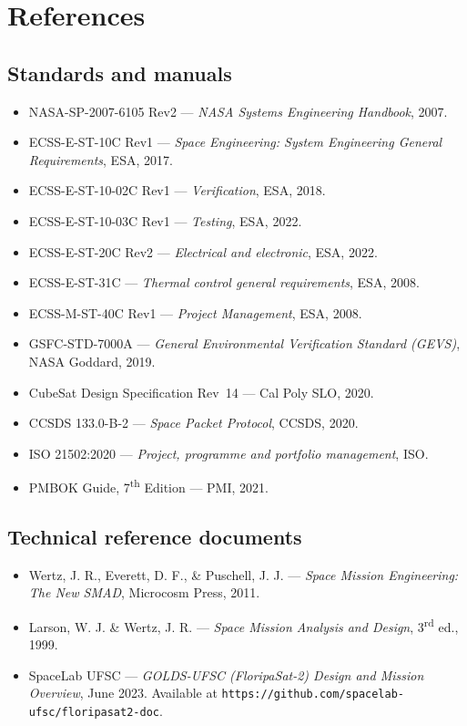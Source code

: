 \chapter{References}

\section*{Standards and manuals}
\begin{itemize}
    \item NASA-SP-2007-6105 Rev2 — \textit{NASA Systems Engineering Handbook}, 2007.
    \item ECSS-E-ST-10C Rev1 — \textit{Space Engineering: System Engineering General Requirements}, ESA, 2017.
    \item ECSS-E-ST-10-02C Rev1 — \textit{Verification}, ESA, 2018.
    \item ECSS-E-ST-10-03C Rev1 — \textit{Testing}, ESA, 2022.
    \item ECSS-E-ST-20C Rev2 — \textit{Electrical and electronic}, ESA, 2022.
    \item ECSS-E-ST-31C — \textit{Thermal control general requirements}, ESA, 2008.
    \item ECSS-M-ST-40C Rev1 — \textit{Project Management}, ESA, 2008.
    \item GSFC-STD-7000A — \textit{General Environmental Verification Standard (GEVS)}, NASA Goddard, 2019.
    \item CubeSat Design Specification Rev~14 — Cal Poly SLO, 2020.
    \item CCSDS 133.0-B-2 — \textit{Space Packet Protocol}, CCSDS, 2020.
    \item ISO 21502:2020 — \textit{Project, programme and portfolio management}, ISO.
    \item PMBOK Guide, 7\textsuperscript{th} Edition — PMI, 2021.
\end{itemize}

\section*{Technical reference documents}
\begin{itemize}
    \item Wertz, J. R., Everett, D. F., \& Puschell, J. J. — \textit{Space Mission Engineering: The New SMAD}, Microcosm Press, 2011.
    \item Larson, W. J. \& Wertz, J. R. — \textit{Space Mission Analysis and Design}, 3\textsuperscript{rd} ed., 1999.
    \item SpaceLab UFSC — \textit{GOLDS-UFSC (FloripaSat-2) Design and Mission Overview}, June 2023. Available at \texttt{https://github.com/spacelab-ufsc/floripasat2-doc}.
\end{itemize}

